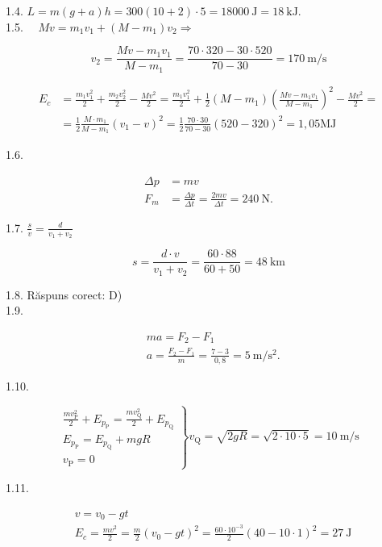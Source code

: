 \documentclass[10pt]{article}
\begin{document}
1.4. $L=m(g+a) h=300(10+2) \cdot 5=18000 \mathrm{~J}=18 \mathrm{~kJ}$.\\
1.5. $\quad M v=m_{1} v_{1}+\left(M-m_{1}\right) v_{2} \Rightarrow$

$$
v_{2}=\frac{M v-m_{1} v_{1}}{M-m_{1}}=\frac{70 \cdot 320-30 \cdot 520}{70-30}=170 \mathrm{~m} / \mathrm{s}
$$

$$
\begin{aligned}
E_{c} & =\frac{m_{1} v_{1}^{2}}{2}+\frac{m_{2} v_{2}^{2}}{2}-\frac{M v^{2}}{2}=\frac{m_{1} v_{1}^{2}}{2}+\frac{1}{2}\left(M-m_{1}\right)\left(\frac{M v-m_{1} v_{1}}{M-m_{1}}\right)^{2}-\frac{M v^{2}}{2}= \\
& =\frac{1}{2} \frac{M \cdot m_{1}}{M-m_{1}}\left(v_{1}-v\right)^{2}=\frac{1}{2} \frac{70 \cdot 30}{70-30}(520-320)^{2}=1,05 \mathrm{MJ}
\end{aligned}
$$

1.6.

$$
\begin{aligned}
\Delta p & =m v \\
F_{m} & =\frac{\Delta p}{\Delta t}=\frac{2 m v}{\Delta t}=240 \mathrm{~N} .
\end{aligned}
$$

1.7. $\frac{s}{v}=\frac{d}{v_{1}+v_{2}}$

$$
s=\frac{d \cdot v}{v_{1}+v_{2}}=\frac{60 \cdot 88}{60+50}=48 \mathrm{~km}
$$

1.8. Răspuns corect: D)\\
1.9.

$$
\begin{aligned}
& m a=F_{2}-F_{1} \\
& a=\frac{F_{2}-F_{1}}{m}=\frac{7-3}{0,8}=5 \mathrm{~m} / \mathrm{s}^{2} .
\end{aligned}
$$

1.10.

$$
\left.\begin{array}{l}
\frac{m v_{\mathrm{P}}^{2}}{2}+E_{p_{\mathrm{P}}}=\frac{m v_{\mathrm{Q}}^{2}}{2}+E_{p_{\mathrm{Q}}} \\
E_{p_{\mathrm{P}}}=E_{p_{\mathrm{Q}}}+m g R \\
v_{\mathrm{P}}=0
\end{array}\right\} v_{\mathrm{Q}}=\sqrt{2 g R}=\sqrt{2 \cdot 10 \cdot 5}=10 \mathrm{~m} / \mathrm{s}
$$

1.11.

$$
\begin{aligned}
& v=v_{0}-g t \\
& E_{c}=\frac{m v^{2}}{2}=\frac{m}{2}\left(v_{0}-g t\right)^{2}=\frac{60 \cdot 10^{-3}}{2}(40-10 \cdot 1)^{2}=27 \mathrm{~J}
\end{aligned}
$$
\end{document}
